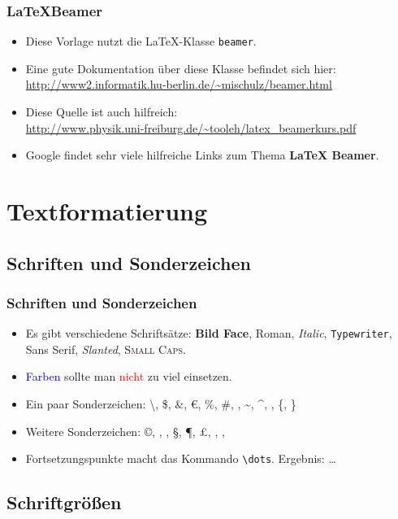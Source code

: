 \begin{frame}[fragile]
	\frametitle{\LaTeX Beamer}
	\begin{itemize}
		\item Diese Vorlage nutzt die \LaTeX-Klasse \texttt{beamer}.
		\item Eine gute Dokumentation über diese Klasse befindet sich hier:\\
		\url{http://www2.informatik.hu-berlin.de/~mischulz/beamer.html}
		\item Diese Quelle ist auch hilfreich:\\
		\url{http://www.physik.uni-freiburg.de/~tooleh/latex_beamerkurs.pdf}
		\item Google findet sehr viele hilfreiche Links zum Thema \textbf{LaTeX Beamer}.
	\end{itemize}
\end{frame}

\section{Textformatierung}

\subsection{Schriften und Sonderzeichen}

\begin{frame}[fragile]
	\frametitle{Schriften und Sonderzeichen}
	\begin{itemize}
		\item Es gibt verschiedene Schriftsätze: \textbf{Bild Face}, \textrm{Roman}, \textit{Italic}, \texttt{Typewriter}, \textsf{Sans Serif}, \textsl{Slanted}, \textsc{Small Caps}.
		\item \textcolor{blue}{Farben} sollte man \textcolor{red}{nicht} zu viel einsetzen.
		\item Ein paar Sonderzeichen: \textbackslash, \$, \&, \euro, \%, \#, \textunderscore, \textasciitilde, \textasciicircum, \textbar, \{, \}
		\item Weitere Sonderzeichen: \copyright, \textregistered, \texttrademark, \S, \P, \pounds, \dag, \ddag, \textbullet
		\item Fortsetzungspunkte macht das Kommando \verb!\dots!. Ergebnis: \dots
	\end{itemize}
\end{frame}

\subsection{Schriftgrößen}

